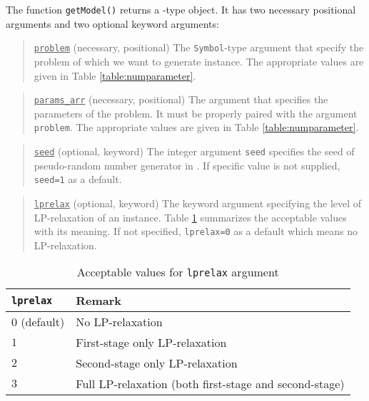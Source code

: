 The function \texttt{getModel()} returns a \jumpmodel-type object. It has two necessary positional arguments and two optional keyword arguments:
\begin{quote}
	\noindent\underline{\texttt{problem}} (necessary, positional) The \texttt{Symbol}-type argument that specify the problem of which we want to generate instance. The appropriate values are given in Table \ref{table:numparameter}. 
\end{quote}

\begin{quote}
	\noindent\underline{\texttt{params\_arr}} (necessary, positional) The argument that specifies the parameters of the problem. It must be properly paired with the argument \texttt{problem}. The appropriate values are given in Table \ref{table:numparameter}. 
\end{quote}

\begin{quote}
	\noindent\underline{\texttt{seed}} (optional, keyword) The integer argument \texttt{seed} specifies the seed of pseudo-random number generator in \julia. If specific value is not supplied, \texttt{seed=1} as a default.
\end{quote}

\begin{quote}
	\noindent\underline{\texttt{lprelax}} (optional, keyword) The keyword argument specifying the level of LP-relaxation of an instance. Table \ref{table:lprelax} summarizes the acceptable values with its meaning. If not specified, \texttt{lprelax=0} as a default which means no LP-relaxation.
\end{quote}

\begin{table}[H]
	\centering
	\caption{Acceptable values for \texttt{lprelax} argument}
	\label{table:lprelax}
	\begin{tabular}{@{}ll@{}}
		\toprule
		\texttt{lprelax} & Remark                                            \\ \midrule
		$0$ (default)              & No LP-relaxation                                  \\
		$1$              & First-stage only LP-relaxation                    \\
		$2$              & Second-stage only LP-relaxation                   \\
		$3$              & Full LP-relaxation (both first-stage and second-stage) \\ \bottomrule
	\end{tabular}%
\end{table}

